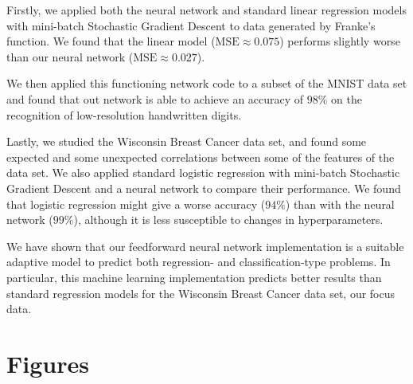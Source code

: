 \documentclass[aps,reprint,superscriptaddress,nofootinbib]{revtex4-2}
\begin{document}
Firstly, we applied both the neural network and standard linear regression models with mini-batch Stochastic Gradient Descent to data generated by Franke's function. We found that the linear model (\(\text{MSE} \approx 0.075\)) performs slightly worse than our neural network (\(\text{MSE} \approx 0.027\)).

We then applied this functioning network code to a subset of the MNIST data set and found that out network is able to achieve an accuracy of \(98\%\) on the recognition of low-resolution handwritten digits.

Lastly, we studied the Wisconsin Breast Cancer data set, and found some expected and some unexpected correlations between some of the features of the data set. We also applied standard logistic regression with mini-batch Stochastic Gradient Descent and a neural network to compare their performance. We found that logistic regression might give a worse accuracy (\(94\%\)) than with the neural network (\(99\%\)), although it is less susceptible to changes in hyperparameters.

We have shown that our feedforward neural network implementation is a suitable adaptive model to predict both regression- and classification-type problems. In particular, this machine learning implementation predicts better results than standard regression models for the Wisconsin Breast Cancer data set, our focus data.





\appendix
\section{Figures}


\end{document}
